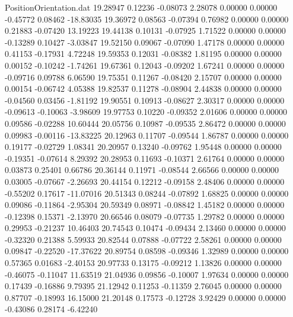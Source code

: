 \begin{filecontents}{PositionOrientation.dat}
  19.28947    0.12236   -0.08073     2.28078    0.00000    0.00000   -0.45772    0.08462  -18.83035
  19.36972    0.08563   -0.07394     0.76982    0.00000    0.00000    0.21883   -0.07420   13.19223
  19.44138    0.10131   -0.07925     1.71522    0.00000    0.00000   -0.13289    0.10427   -3.03847
  19.52150    0.09067   -0.07090     1.47178    0.00000    0.00000    0.41153   -0.17931    4.72248
  19.59353    0.12031   -0.08382     1.81195    0.00000    0.00000    0.00152   -0.10242   -1.74261
  19.67361    0.12043   -0.09202     1.67241    0.00000    0.00000   -0.09716    0.09788    6.06590
  19.75351    0.11267   -0.08420     2.15707    0.00000    0.00000    0.00154   -0.06742    4.05388
  19.82537    0.11278   -0.08904     2.44838    0.00000    0.00000   -0.04560    0.03456   -1.81192
  19.90551    0.10913   -0.08627     2.30317    0.00000    0.00000   -0.09613   -0.10063   -3.98609
  19.97753    0.10220   -0.09352     2.01606    0.00000    0.00000    0.09586   -0.02288   10.60444
  20.05756    0.10987   -0.09535     2.86472    0.00000    0.00000    0.09983   -0.00116  -13.83225
  20.12963    0.11707   -0.09544     1.86787    0.00000    0.00000    0.19177   -0.02729    1.08341
  20.20957    0.13240   -0.09762     1.95448    0.00000    0.00000   -0.19351   -0.07614    8.29392
  20.28953    0.11693   -0.10371     2.61764    0.00000    0.00000    0.03873    0.25401    0.66786
  20.36144    0.11971   -0.08544     2.66566    0.00000    0.00000    0.03005   -0.07667   -2.26693
  20.44154    0.12212   -0.09158     2.48406    0.00000    0.00000   -0.55202    0.17617  -11.07016
  20.51343    0.08244   -0.07892     1.68825    0.00000    0.00000    0.09086   -0.11864   -2.95304
  20.59349    0.08971   -0.08842     1.45182    0.00000    0.00000   -0.12398    0.15371   -2.13970
  20.66546    0.08079   -0.07735     1.29782    0.00000    0.00000    0.29953   -0.21237   10.46403
  20.74543    0.10474   -0.09434     2.13460    0.00000    0.00000   -0.32320    0.21388    5.59933
  20.82544    0.07888   -0.07722     2.58261    0.00000    0.00000    0.09847   -0.22520  -17.37622
  20.89754    0.08598   -0.09346     1.32989    0.00000    0.00000    0.57365    0.01683   -2.40153
  20.97733    0.13175   -0.09212     1.13826    0.00000    0.00000   -0.46075   -0.11047   11.63519
  21.04936    0.09856   -0.10007     1.97634    0.00000    0.00000    0.17439   -0.16886    9.79395
  21.12942    0.11253   -0.11359     2.76045    0.00000    0.00000    0.87707   -0.18993   16.15000
  21.20148    0.17573   -0.12728     3.92429    0.00000    0.00000   -0.43086    0.28174   -6.42240

\end{filecontents}
